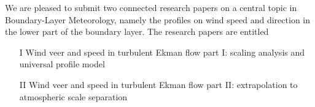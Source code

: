 \documentclass[brief]{fub}
\begin{document}


We are pleased to submit two connected research papers on a central topic in Boundary-Layer Meteorology,
namely the profiles on wind speed and direction in the lower part of the boundary layer.
%
The research papers are entitled
\begin{itemize}
\item[I] Wind veer and speed in turbulent Ekman flow part I: scaling analysis and universal profile model
\item[II] Wind veer and speed in turbulent Ekman flow part II: extrapolation to atmospheric scale separation
\end{itemize} 
\end{document}
